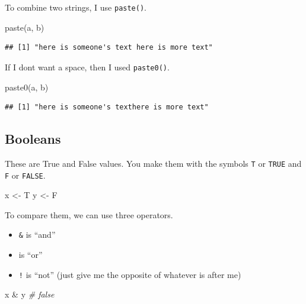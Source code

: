 \documentclass[
]{book}
\newenvironment{Shaded}{\begin{snugshade}}{\end{snugshade}}
\newcommand{\CommentTok}[1]{\textcolor[rgb]{0.56,0.35,0.01}{\textit{#1}}}
\newcommand{\FunctionTok}[1]{\textcolor[rgb]{0.00,0.00,0.00}{#1}}
\newcommand{\NormalTok}[1]{#1}
\newcommand{\OtherTok}[1]{\textcolor[rgb]{0.56,0.35,0.01}{#1}}
\newcommand{\SpecialCharTok}[1]{\textcolor[rgb]{0.00,0.00,0.00}{#1}}
\providecommand{\tightlist}{%
  \setlength{\itemsep}{0pt}\setlength{\parskip}{0pt}}
\begin{document}
To combine two strings, I use \texttt{paste()}.

\begin{Shaded}
\begin{Highlighting}[]
\FunctionTok{paste}\NormalTok{(a, b)}
\end{Highlighting}
\end{Shaded}

\begin{verbatim}
## [1] "here is someone's text here is more text"
\end{verbatim}

If I dont want a space, then I used \texttt{paste0()}.

\begin{Shaded}
\begin{Highlighting}[]
\FunctionTok{paste0}\NormalTok{(a, b)}
\end{Highlighting}
\end{Shaded}

\begin{verbatim}
## [1] "here is someone's texthere is more text"
\end{verbatim}

\hypertarget{booleans}{%
\subsection{Booleans}\label{booleans}}

These are True and False values. You make them with the symbols \texttt{T} or \texttt{TRUE} and \texttt{F} or \texttt{FALSE}.

\begin{Shaded}
\begin{Highlighting}[]
\NormalTok{x }\OtherTok{\textless{}{-}}\NormalTok{ T}
\NormalTok{y }\OtherTok{\textless{}{-}}\NormalTok{ F}
\end{Highlighting}
\end{Shaded}

To compare them, we can use three operators.

\begin{itemize}
\tightlist
\item
  \texttt{\&} is ``and''
\item
  \texttt{\textbar{}} is ``or''
\item
  \texttt{!} is ``not'' (just give me the opposite of whatever is after me)
\end{itemize}

\begin{Shaded}
\begin{Highlighting}[]
\NormalTok{x }\SpecialCharTok{\&}\NormalTok{ y }\CommentTok{\# false}
\end{Highlighting}
\end{Shaded}
\end{document}
